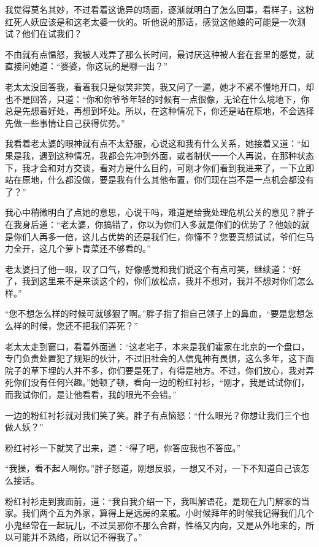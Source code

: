 我觉得莫名其妙，不过看着这诡异的场面，逐渐就明白了怎么回事，看样子，这粉红死人妖应该是和这老太婆一伙的。听他说的那话，感觉这他娘的可能是一次测试？他们在试我们？

不由就有点愠怒，我被人戏弄了那么长时间，最讨厌这种被人套在套里的感觉，就直接问她道：“婆婆，你这玩的是哪一出？”

老太太没回答我，看着我只是似笑非笑，我又问了一遍，她才不紧不慢地开口，却也不是回答，只道：“你和你爷爷年轻的时候有一点很像，无论在什么境地下，你总是先想着好处，再想到坏处。所以，在这种情况下，你还是站在原地，不会选择先做一些事情让自己获得优势。”

我看着老太婆的眼神就有点不太舒服，心说这和我有什么关系，她接着又道：“如果是我，遇到这种情况，我都会先冲到外面，或者制伏一一个人再说，在那种状态下，我才会和对方交谈，看对方是什么目的，可刚才你们看到我进来了，一下立即站在原地，什么都没做，要是我有什么其他布置，你们现在岂不是一点机会都没有了？”

我心中稍微明白了点她的意思，心说干吗，难道是给我处理危机公关的意见？胖子在我身后道：“老太婆，你搞错了，你以为你们人多就是你们的优势了？他娘的就是你们人再多一倍，这儿占优势的还是我们仨，你懂不？您要真想试试，爷们仨马力全开，这几个萝卜青菜还不够看的。”

老太婆扫了他一眼，叹了口气，好像感觉和我们说这个有点可笑，继续道：“好了，我到这里来不是来谈这个的，你们放松点，我并不想对，我并不想对你们怎么样。”

“您不想怎么样的时候可就够狠了啊。”胖子指了指自己领子上的鼻血，“要是您想怎么样的时候，您还不把我们弄死？”

老太太走到窗口，看着外面道：“这老宅子，本来是我们霍家在北京的一个盘口，专门负责处置犯了规矩的伙计，不过旧社会的人信鬼神有畏惧，这么多年，这下面院子的草下埋的人并不多，你们要是死了，有得是地方。不过，你们放心，我对弄死你们没有任何兴趣。”她顿了顿，看向一边的粉红衬衫，“刚才，我是试试你们，而我试你们，是让他看看，我的眼光不会错。”

一边的粉红衬衫就对我们笑了笑。胖子有点恼怒：“什么眼光？你想让我们三个也做人妖？”

粉红衬衫一下就笑了出来，道：“得了吧，你答应我也不答应。”

“我操，看不起人啊你。”胖子怒道，刚想反驳，一想又不对，一下不知道自己该怎么接话。

粉红衬衫走到我面前，道：“我自我介绍一下，我叫解语花，是现在九门解家的当家。我们两个互为外家，算得上是远房的亲戚。小时候拜年的时候我记得我们几个小鬼经常在一起玩儿，不过吴邪你不那么合群，性格又内向，又是从外地来的，所以可能并不熟络，所以记不得我了。”

